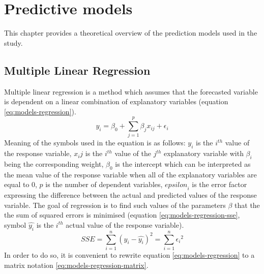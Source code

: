 \chapter{Predictive models}\label{chap:predictive-models}
This chapter provides a theoretical overview of the prediction models used in the study.

\section{Multiple Linear Regression}\label{sec:models-regression}
Multiple linear regression is a method which assumes that the forecasted variable is dependent on a linear combination of explanatory variables (equation \ref{eq:models-regression}).
\begin{equation}\label{eq:models-regression}
    y_i = {\beta}_0 + \sum_{j = 1}^{p} {{\beta}_j x_{ij}} + {\epsilon}_i
\end{equation}
Meaning of the symbols used in the equation is as follows: $y_i$ is the $i^{th}$ value of the response variable, $x_ij$ is the $i^{th}$ value of the $j^{th}$ explanatory variable with ${\beta}_i$ being the corresponding weight, ${\beta}_0$ is the intercept which can be interpreted as the mean value of the response variable when all of the explanatory variables are equal to 0, $p$ is the number of dependent variables, ${epsilon}_i$ is the error factor expressing the difference between the actual and predicted values of the response variable. 
The goal of regression is to find such values of the parameters $\beta$ that the the sum of squared errors is minimised (equation \ref{eq:models-regression-sse}, symbol $\hat{y_i}$ is the $i^{th}$ actual value of the response variable).
\begin{equation}\label{eq:models-regression-sse}
    SSE = \sum_{i=1}^{n} {(y_i -  \hat{y_i})^2} = \sum_{i = 1}^{n} {{\epsilon}_i}^2
\end{equation}
In order to do so, it is convenient to rewrite equation \ref{eq:models-regression} to a matrix notation \ref{eq:models-regression-matrix}.
